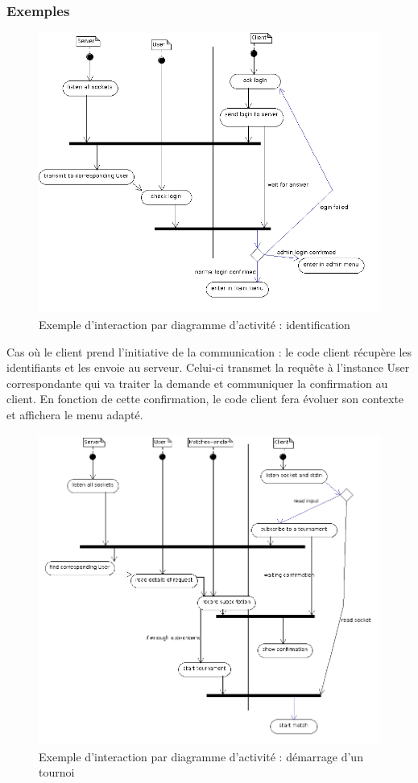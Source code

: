 \documentclass[a4paper,titlepage]{scrreprt}
\begin{document}
  \subsubsection{Exemples}
    \begin{figure}[H]
    \center
    \includegraphics[scale=0.5]{uml/Activity_Login.png}
    \caption{Exemple d'interaction par diagramme d'activité : identification} \label{diag-login}
    \end{figure}
    Cas où le client prend l'initiative de la communication : le code client récupère les identifiants et les envoie au serveur.
    Celui-ci transmet la requête à l'instance User correspondante qui va traiter la demande et communiquer la confirmation au client.
    En fonction de cette confirmation, le code client fera évoluer son contexte et affichera le menu adapté.
    \begin{figure}[H]
    \center
    \includegraphics[scale=0.5]{uml/Activity_Tournamentmatch.png}
    \caption{Exemple d'interaction par diagramme d'activité : démarrage d'un tournoi} \label{diag-tournament}
    \end{figure}
\end{document}
